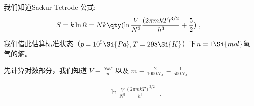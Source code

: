 


我们知道Sackur-Tetrode 公式:
\begin{equation}
S = k\ln \Omega  = Nk \qty(\ln \frac{V}{N^3} \frac{(2\pi mkT)^{3/2}}{h^3} + \frac52)~,
\end{equation}

我们借此估算标准状态（$p=10^5 \Si{Pa}, T=298\Si{K}$）下$n=1 \Si{mol}$氢气的熵。

先计算对数部分，我们知道 $V=\frac{NkT}{p}$ 以及 $m = \frac{2}{1000 N_A} = \frac{1}{500 N_A}$

$$
\begin{aligned}
 & \ln \frac{V}{N^3} \frac{(2\pi mkT)^{3/2}}{h^3} \\
 = &
\end{aligned}~.
$$
